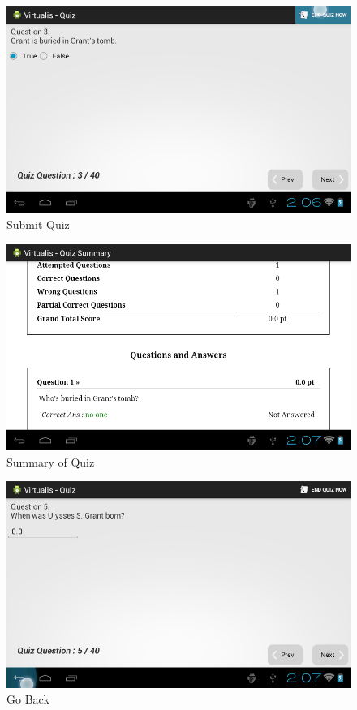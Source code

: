 \documentclass[12pt]{report}
\begin{document}
\begin{figure}[H]
 \centering
 \includegraphics[width=15cm]{./30.png}
 \caption{Submit Quiz \label{fig:30}}
\end{figure}

\begin{figure}[H]
 \centering
 \includegraphics[width=15cm]{./31.png}
 \caption{Summary of Quiz\label{fig:31}}
\end{figure}

\begin{figure}[H]
 \centering
 \includegraphics[width=15cm]{./32.png}
 \caption{Go Back \label{fig:32}}
\end{figure}
\end{document}
